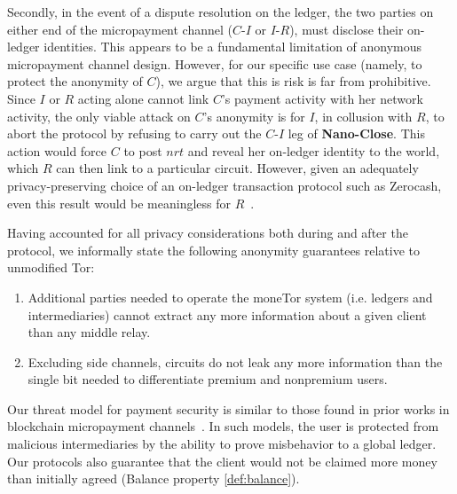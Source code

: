 Secondly, in the event of a dispute resolution on the ledger, the two parties on
either end of the micropayment channel ($C$-$I$ or $I$-$R$), must disclose their
on-ledger identities. This appears to be a fundamental limitation of anonymous
micropayment channel design. However, for our specific use case (namely, to
protect the anonymity of $C$), we argue that this is risk is far from
prohibitive. Since $I$ or $R$ acting alone cannot link $C$'s payment activity
with her network activity, the only viable attack on $C$'s anonymity is for $I$,
in collusion with $R$, to abort the protocol by refusing to carry out the
$C$-$I$ leg of \textbf{Nano-Close}. This action would force $C$ to post $nrt$
and reveal her on-ledger identity to the world, which $R$ can then link to a
particular circuit. However, given an adequately privacy-preserving choice of an
on-ledger transaction protocol such as Zerocash, even this result would be
meaningless for $R$~\cite{sasson2014zerocash}.

Having accounted for all privacy considerations both during and after the
protocol, we informally state the following anonymity guarantees relative to
unmodified Tor:

\begin{enumerate}
\item Additional parties needed to operate the moneTor system (i.e. ledgers and
  intermediaries) cannot extract any more information about a given client than
  any middle relay.
\item Excluding side channels, circuits do not leak any more information than
  the single bit needed to differentiate premium and nonpremium users.
\end{enumerate}

Our threat model for payment security is similar to those found in prior works
in blockchain micropayment channels~\cite{poon2016bitcoin}. In such models, the
user is protected from malicious intermediaries by the ability to prove
misbehavior to a global ledger. Our protocols also guarantee that the client
would not be claimed more money than initially agreed (Balance property
\ref{def:balance}).

